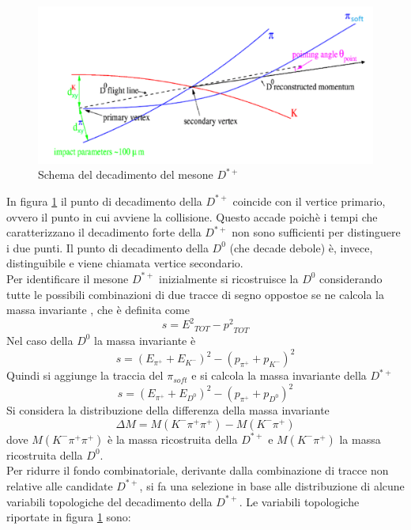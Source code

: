     \begin{figure}[htbp]
        \centering
        \includegraphics[width=0.9\linewidth]{introParticelle/DecadimentoDStar.png}
        \caption{ Schema del decadimento del mesone $D^{*+}$}
        \label{fig:decadimentoD}
    \end{figure}
In figura \ref{fig:decadimentoD} il punto di decadimento della $D^{*+}$ coincide con il vertice primario, ovvero il punto in cui avviene la collisione. Questo accade poich\`e i tempi che caratterizzano il decadimento forte della $D^{*+}$ non sono sufficienti per distinguere i due punti. Il punto di decadimento della $D^0$ (che decade debole) \`e, invece, distinguibile e viene chiamata vertice secondario.
\\Per identificare il mesone $D^{*+}$ inizialmente si ricostruisce la $D^0$ considerando tutte le possibili combinazioni di due tracce di segno oppostoe se ne calcola la massa invariante , che \`e definita come 
    \begin{equation}
        s = {E^2}_{TOT} - {p^2}_{TOT}
    \end{equation}
Nel caso della $D^0$ la massa invariante \`e  
    \begin{equation}
        s = ({E_{\pi^+}+E_{K^-}})^2 - ({p_{\pi^+}+p_{K^-}})^2
    \end{equation}
Quindi si aggiunge la traccia del $\pi_{soft}$ e si calcola la massa invariante della $D^{*+}$
    \begin{equation}
        s = ({E_{\pi^+}+E_{D^0}})^2 - ({p_{\pi^+}+p_{D^0}})^2
    \end{equation}
Si considera la distribuzione della differenza della massa invariante 
  \begin{equation}
       \Delta M = M (K^- \pi^+ \pi^+) - M(K^- \pi^+)
    \end{equation}
dove $ M (K^- \pi^+ \pi^+)$ \`e la massa ricostruita della $D^{*+}$ e 
$ M(K^- \pi^+)$ la massa ricostruita della $D^{0}$.
\\Per ridurre il fondo combinatoriale, derivante dalla combinazione di tracce non relative alle candidate $D^{*+}$, si fa una selezione in base alle distribuzione di alcune variabili topologiche del decadimento della $D^{*+}$. Le variabili topologiche riportate in figura \ref{fig:decadimentoD} sono:
